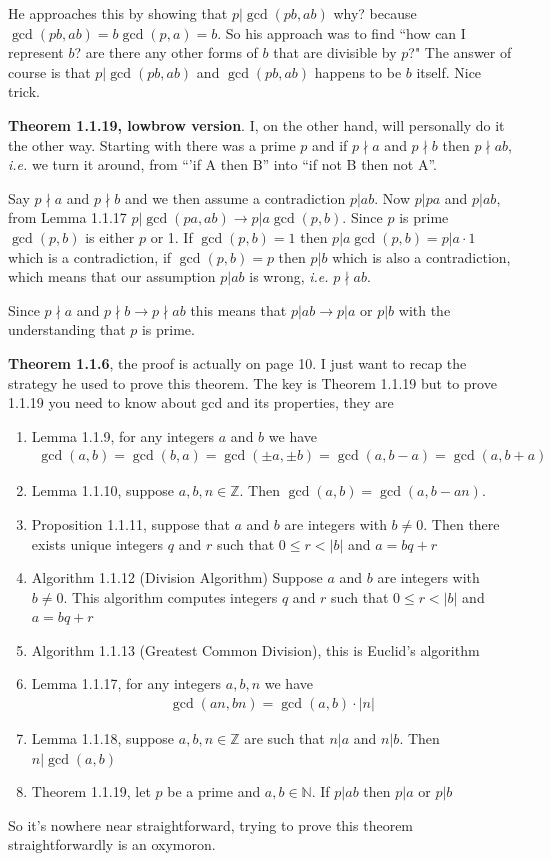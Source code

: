 \documentclass[aps,preprint,preprintnumbers,nofootinbib,showpacs,prd]{revtex4-1}
\newcommand{\ie}{{\it i.e.} }
\newcommand{\nbea}{\begin{eqnarray*}}
\newcommand{\neea}{\end{eqnarray*}}
\begin{document}
He approaches this by showing that $p|\gcd(pb, ab)$ why? because $\gcd(pb, ab) = b\gcd(p, a) = b$. So his approach was to find ``how can I represent $b$? are there any other forms of $b$ that are divisible by $p$?" The answer of course is that $p|\gcd(pb, ab)$ and $\gcd(pb, ab)$ happens to be $b$ itself. Nice trick.

{\bf Theorem 1.1.19, lowbrow version}. I, on the other hand, will personally do it the other way. Starting with there was a prime $p$ and if $p \nmid a$ and $p \nmid b$ then $p \nmid ab$, \ie we turn it around, from ``'if A then B'' into ``if not B then not A''.

Say $p \nmid a$ and $p \nmid b$ and we then assume a contradiction $p | ab$. Now $p | pa$ and $p | ab$, from Lemma 1.1.17 $p | \gcd(pa,ab) \to p | a \gcd (p,b)$. Since $p$ is prime $\gcd(p,b)$ is either $p$ or 1. If $\gcd(p,b) = 1$ then $p | a \gcd (p,b) = p|a \cdot 1$ which is a contradiction, if $\gcd(p,b) = p$ then $p|b$ which is also a contradiction, which means that our assumption $p|ab$ is wrong, \ie $p \nmid ab$.

Since $p \nmid a$ and $p \nmid b \longrightarrow p \nmid ab$ this means that $p|ab \longrightarrow p|a$ or $p|b$ with the understanding that $p$ is prime.


{\bf Theorem 1.1.6}, the proof is actually on page 10. I just want to recap the strategy he used to prove this theorem. The key is Theorem 1.1.19 but to prove 1.1.19 you need to know about gcd and its properties, they are
\begin{enumerate}
\item Lemma 1.1.9, for any integers $a$ and $b$ we have
%
\nbea
\gcd(a,b) = \gcd(b,a) = \gcd(\pm a,\pm b) = \gcd(a,b-a) = \gcd(a,b+a)
\neea
%
\item Lemma 1.1.10, suppose $a,b,n \in \mathbb{Z}$. Then $\gcd(a,b) = \gcd(a,b-an)$.
\item Proposition 1.1.11, suppose that $a$ and $b$ are integers with $b \neq 0$. Then there exists unique integers $q$ and $r$ such that $0 \le r < |b|$ and $a = bq + r$
\item Algorithm 1.1.12 (Division Algorithm) Suppose $a$ and $b$ are integers with $b \neq 0$. This algorithm computes integers $q$ and $r$ such that $0 \le r < |b|$ and $a = bq + r$
\item Algorithm 1.1.13 (Greatest Common Division), this is Euclid's algorithm
\item Lemma 1.1.17, for any integers $a,b,n$ we have
%
\nbea
\gcd(an,bn) = \gcd(a,b) \cdot |n|
\neea
%
\item Lemma 1.1.18, suppose $a,b,n \in \mathbb{Z}$ are such that $n|a$ and $n|b$. Then $n|\gcd(a,b)$
\item Theorem 1.1.19, let $p$ be a prime and $a,b \in \mathbb{N}$. If $p|ab$ then $p|a$ or $p|b$
\end{enumerate}
So it's nowhere near straightforward, trying to prove this theorem straightforwardly is an oxymoron.
\end{document}
